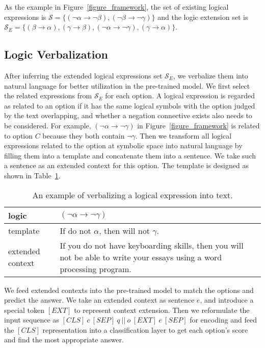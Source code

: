 \documentclass[11pt,a4paper]{article}
\begin{document}
As the example in Figure~\ref{figure_framework}, the set of existing logical expressions is $\mathcal{S}=\{(\neg \alpha \rightarrow \neg \beta), (\neg \beta \rightarrow \neg \gamma)\}$ and the logic extension set is $\mathcal{S}_E=\{(\beta \rightarrow \alpha), (\gamma \rightarrow \beta), (\neg \alpha \rightarrow \neg \gamma), (\gamma \rightarrow \alpha)\}$.

\subsection{Logic Verbalization}
\label{sec:translation_step}
After inferring the extended logical expressions set $\mathcal{S}_E$, we verbalize them into natural language for better utilization in the pre-trained model.
We first select the related expressions from $\mathcal{S}_E$ for each option. A logical expression is regarded as related to an option if it has the same logical symbols with the option judged by the text overlapping, and whether a negation connective exists also needs to be considered. 
For example, $(\neg \alpha \rightarrow \neg \gamma)$ in Figure~\ref{figure_framework} is related to option $C$ because they both contain $\neg \gamma$. Then we transform all logical expressions related to the option at symbolic space into natural language by filling them into a template and concatenate them into a sentence. We take such a sentence as an extended context for this option. The template is designed as shown in Table~\ref{table_template}.
\begin{table}[ht]
\begin{center}
\begin{tabular}{|p{1.3cm}|p{5.5cm}|}
\hline
logic & $(\neg \alpha \rightarrow \neg \gamma)$ \\
\hline
template & If do not $\alpha$, then will not $\gamma$. \\
\hline
extended context & If you do not have keyboarding skills, then you will not be able to write your essays using a word processing program.\\
\hline
\end{tabular}
\end{center}
\caption{\label{table_template} An example of verbalizing a logical expression into text.}
\end{table}

We feed extended contexts into the pre-trained model to match the options and predict the answer. 
We take an extended context as sentence $e$, and introduce a special token $[EXT]$ to represent context extension. Then we reformulate the input sequence as
$[CLS] \ c \ [SEP] \ q \ || \ o \ [EXT] \ e \ [SEP]$ for encoding and feed the $[CLS]$ representation into a classification layer to get each option's score and find the most appropriate answer.  
\end{document}
